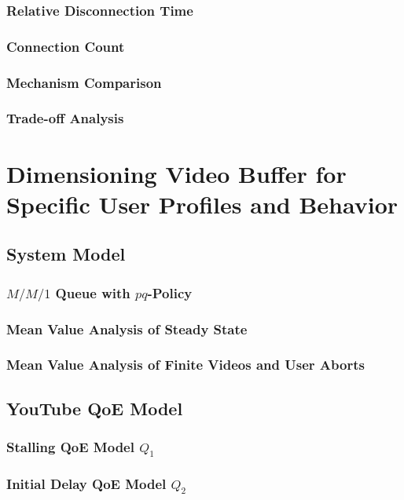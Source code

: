 \subsubsection*{Relative Disconnection Time}
\subsubsection*{Connection Count}
\subsubsection*{Mechanism Comparison}
\subsubsection*{Trade-off Analysis}

\section{Dimensioning Video Buffer for Specific User Profiles and Behavior}
\cite{Hossfeld2015}

\subsection{System Model}
\subsubsection*{$M/M/1$ Queue with $pq$-Policy}
\subsubsection*{Mean Value Analysis of Steady State}
\subsubsection*{Mean Value Analysis of Finite Videos and User Aborts}

\subsection{YouTube QoE Model}
\subsubsection*{Stalling QoE Model $Q_1$}
\subsubsection*{Initial Delay QoE Model $Q_2$}
